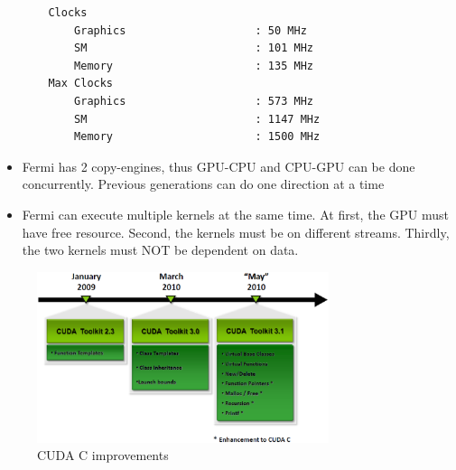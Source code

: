\begin{itemize}
\begin{verbatim}
    Clocks
        Graphics                    : 50 MHz
        SM                          : 101 MHz
        Memory                      : 135 MHz
    Max Clocks
        Graphics                    : 573 MHz
        SM                          : 1147 MHz
        Memory                      : 1500 MHz

\end{verbatim}


\item Fermi has 2 copy-engines, thus GPU-CPU and CPU-GPU can be done
  concurrently. Previous generations can do one direction at a time
\item Fermi can execute multiple kernels at the same time. At first,
  the GPU must have free resource. Second, the kernels must be on
  different streams. Thirdly, the two kernels must NOT be dependent on
  data. 
\end{itemize}

\begin{figure}[hbt]
  \centerline{\includegraphics[height=5cm,
    angle=0]{./images/CUDA_C_new.eps}}
\caption{CUDA C improvements}
\label{fig:CUDA_C}
\end{figure}



